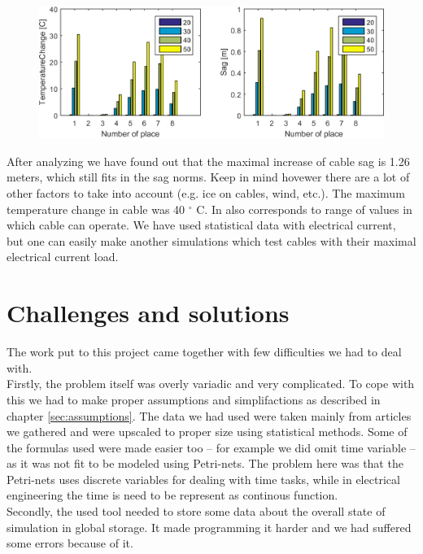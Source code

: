 \documentclass[a4paper]{article}
\begin{document}
\begin{figure}[!h]
\centering
\includegraphics[scale=0.44]{schemas/img9_2.png}
\label{fig:img9_2}
\end{figure}

\clearpage

After analyzing we have found out that the maximal increase of cable sag is 1.26 meters, which still fits in the sag norms. Keep in mind hovewer there are a lot of other factors to take into account (e.g. ice on cables, wind, etc.). The maximum temperature change in  cable was 40 $^{\circ}$ C. In also corresponds to range of values in which cable can operate. We have used statistical data with electrical current, but one can easily make another simulations which test cables with their maximal electrical current load.
%
\section{Challenges and solutions}    
\label{cha:ChallengesAndSolutions}

The work put to this project came together with few difficulties we had to deal with.\\

Firstly, the problem itself was overly variadic and very complicated. To cope with this we had to make proper assumptions and simplifactions as described in chapter \ref{sec:assumptions}. The data we had used were taken mainly from articles we gathered and were upscaled to proper size using statistical methods. Some of the formulas used were made easier too -- for example we did omit time variable -- as it was not fit to be modeled using Petri-nets. The problem here was that the Petri-nets uses discrete variables for dealing with time tasks, while in electrical engineering the time is need to be represent as continous function.\\

Secondly, the used tool needed to store some data about the overall state of simulation in global storage. It made programming it harder and we had suffered some errors because of it.\\
\end{document}
